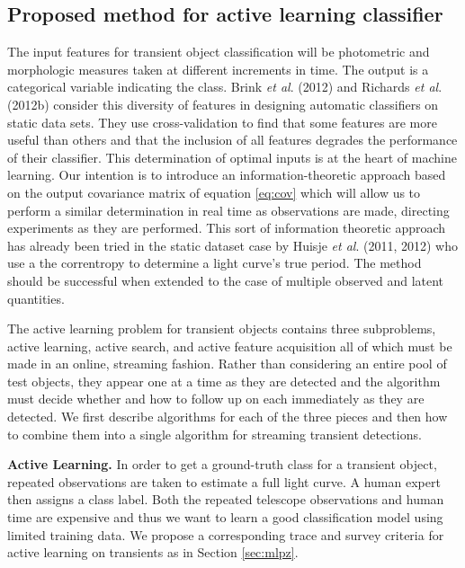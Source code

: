 \documentclass[useAMS,usenatbib,tightenlines,11pt,preprint]{aastex}
\begin{document}
\subsection{Proposed method for active learning classifier}

The input features for transient object classification will be photometric
and morphologic measures taken at different increments in time.  The output
is a categorical variable indicating the class.
Brink {\it et al}. (2012) and Richards {\it et al}. (2012b) consider this
diversity of features in designing automatic classifiers on static data sets. 
They use cross-validation to
find that some features are more useful than others and that the inclusion
of all features degrades the performance of their classifier.  This
determination of optimal inputs is at the heart of machine learning.  Our
intention is to introduce an information-theoretic approach 
based on the output covariance matrix of equation \ref{eq:cov} which will allow
us to perform a similar determination in real time as observations are made,
directing experiments as they are performed.  This sort of information theoretic
approach has already been tried in the static dataset case by Huisje {\it et al}. 
(2011, 2012) who use a the correntropy to determine a light curve's 
true period.  The method should be successful when extended to the case of
multiple observed and latent quantities.

The active learning problem for transient objects contains three
subproblems, active learning, active search, and active feature
acquisition all of which must be made in an online, streaming fashion.  
Rather than
considering an entire pool of test objects, they appear one at a time as
they are detected and the algorithm must decide whether and how to follow
up on each immediately as they are detected.  We first describe algorithms
for each of the three pieces and then how to combine them into a single
algorithm for streaming transient detections.

{\bf Active Learning.} In order to get a ground-truth class for a transient
object, repeated observations are taken to estimate a full light curve.  A
human expert then assigns a class label.  Both the repeated telescope
observations and human time are expensive and thus we want to learn a good
classification model using limited training data.  We propose a
corresponding trace and survey criteria for active learning on transients
as in Section \ref{sec:mlpz}.
\end{document}
